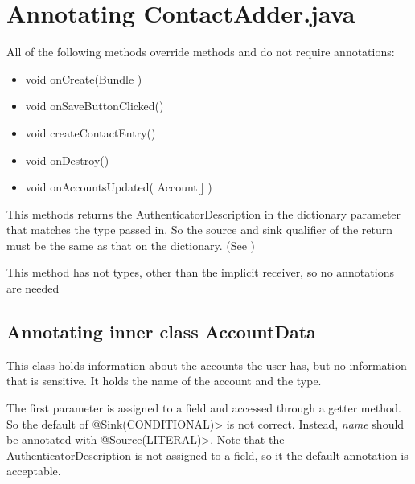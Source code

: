  
\section{Annotating ContactAdder.java}
 All of the following methods override methods and do not require annotations:
\begin{itemize}
\item{  void onCreate(Bundle )}
\item{  void onSaveButtonClicked() }
\item{  void createContactEntry() }
\item{   void onDestroy() }
\item{   void onAccountsUpdated( Account[] ) }
\end{itemize}

This methods returns the AuthenticatorDescription in the dictionary parameter that 
matches the type passed in.  So the source and sink qualifier of the return must
be the same as that on the dictionary. (See )

             
        
 This method has not types, other than the implicit receiver, so no annotations are needed


\subsection{Annotating inner class AccountData }
    This class holds information about the accounts the user has, but no information that is
     sensitive.  It holds the name of the account and the type. 

 The first parameter is assigned to a field and accessed through a getter method.  So the 
 default of \<@Sink(CONDITIONAL)> is not correct.  Instead, \emph{name} should be 
 annotated with \<@Source(LITERAL)>.  Note that the AuthenticatorDescription is not assigned to a field, so it the default annotation is acceptable.



